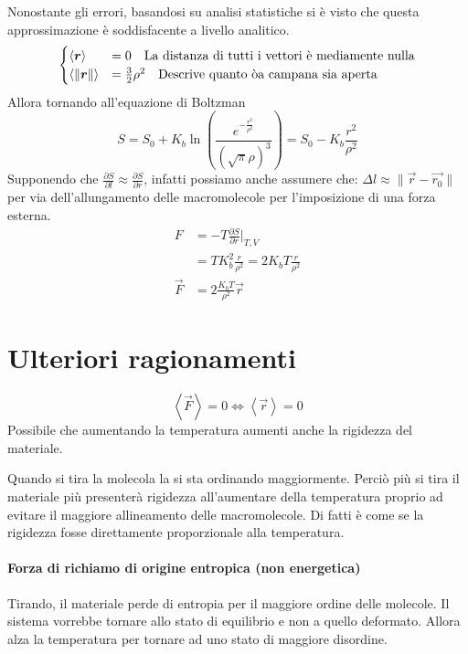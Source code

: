 Nonostante gli errori, basandosi su analisi statistiche si è visto che questa approssimazione è soddisfacente a livello analitico.
\begin{equation}
\begin{cases}
\left\langle \vec{r}\right\rangle &= 0 \quad\textup{La distanza di tutti i vettori è mediamente nulla}\\
\left\langle \lVert \vec{r} \rVert \right\rangle &= \frac{3}{2}\rho^2 \quad\textup{Descrive quanto òa campana sia aperta}
\end{cases}
\end{equation}
Allora tornando all'equazione di Boltzman
\begin{equation}
S = S_0 + K_b\ln\left(\frac{e^{-\frac{r^2}{\rho^2}}}{(\sqrt{\pi}\rho)^3}\right) = S_0 - K_b \frac{r^2}{\rho^2}
\end{equation}
Supponendo che $\frac{\partial S}{\partial l} \approx \frac{\partial S}{\partial r}$, infatti possiamo anche assumere che: $\Delta l \approx \lVert \vec{r} - \vec{r_0}\rVert$ per via dell'allungamento delle macromolecole per l'imposizione di una forza esterna.
\begin{equation}
\begin{split}
F &= - T\frac{\partial S}{\partial r}\Big|_{T,V}\\
&= T K_b^2 \frac{r}{\rho^2} = 2 K_b T \frac{r}{\rho^2}\\
\vec{F} &= 2 \frac{K_b T}{\rho^2}\vec{r}
\end{split}
\end{equation}

\section{Ulteriori ragionamenti}
\begin{equation}
\left\langle \vec{F} \right\rangle = 0 \Leftrightarrow \left\langle \vec{r}\right\rangle = 0
\end{equation}
Possibile che aumentando la temperatura aumenti anche la rigidezza del materiale.

Quando si tira la molecola la si sta ordinando maggiormente. Perciò più si tira il materiale più presenterà rigidezza all'aumentare della temperatura proprio ad evitare il maggiore allineamento delle macromolecole.
Di fatti è come se la rigidezza fosse direttamente proporzionale alla temperatura.

\paragraph{Forza di richiamo di origine entropica (non energetica)}
Tirando, il materiale perde di entropia per il maggiore ordine delle molecole.
Il sistema vorrebbe tornare allo stato di equilibrio e non a quello deformato.
Allora alza la temperatura per tornare ad uno stato di maggiore disordine.

